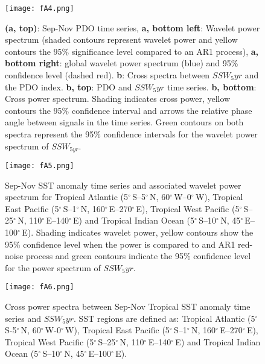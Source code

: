 \documentclass[wcd, manuscript]{copernicus}
\begin{document}
\begin{center}
\begin{figure}[h!]
\noindent\texttt{[image: fA4.png]}
\caption{\textbf{(a, top)}: Sep-Nov PDO time series, \textbf{a, bottom left}: Wavelet power spectrum (shaded contours represent wavelet power and yellow contours the 95\% significance level compared to an AR1 process), \textbf{a, bottom right}: global wavelet power spectrum (blue) and 95\% confidence level (dashed red). \textbf{b}: Cross spectra between $SSW_5yr$ and the PDO index. \textbf{b, top}: PDO and $SSW_5yr$ time series. \textbf{b, bottom}: Cross power spectrum. Shading indicates cross power, yellow contours the 95\% confidence interval and arrows the relative phase angle between signals in the time series. Green contours on both spectra represent the 95\% confidence intervals for the wavelet power spectrum of $SSW_{5yr}$.}
\end{figure}
\end{center}


\begin{center}
\begin{figure}[h!]
\noindent\texttt{[image: fA5.png]}
\caption{Sep-Nov SST anomaly time series and associated wavelet power spectrum for Tropical Atlantic (5$^{\circ}$\,S–5$^{\circ}$\,N, 60$^{\circ}$\,W–0$^{\circ}$\,W), Tropical East Pacific (5$^{\circ}$\,S–1$^{\circ}$\,N, 160$^{\circ}$\,E–270$^{\circ}$\,E), Tropical West Pacific (5$^{\circ}$\,S–25$^{\circ}$\,N, 110$^{\circ}$\,E–140$^{\circ}$\,E) and Tropical Indian Ocean (5$^{\circ}$\,S–10$^{\circ}$\,N, 45$^{\circ}$\,E–100$^{\circ}$\,E). Shading indicates wavelet power, yellow contours show the 95\% confidence level when the power is compared to and AR1 red-noise process and green contours indicate the 95\% confidence level for the power spectrum of $SSW_5yr$.}
\label{fig3}
\end{figure}
\end{center}

\begin{center}
\begin{figure}[h!]
\noindent\texttt{[image: fA6.png]}
\caption{Cross power spectra between Sep-Nov Tropical SST anomaly time series and $SSW_5yr$. SST regions are defined as: Tropical Atlantic (5$^{\circ}$\,S-5$^{\circ}$\,N, 60$^{\circ}$\,W-0$^{\circ}$\,W), Tropical East Pacific (5$^{\circ}$\,S–1${^\circ}$\,N, 160$^{\circ}$\,E–270$^{\circ}$\,E), Tropical West Pacific (5$^{\circ}$\,S–25$^{\circ}$\,N, 110$^{\circ}$\,E–140$^{\circ}$\,E) and Tropical Indian Ocean (5$^{\circ}$\,S–10$^{\circ}$\,N, 45$^{\circ}$\,E–100$^{\circ}$\,E).}
\label{fig3}
\end{figure}
\end{center}
\end{document}
